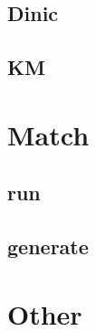 

\subsection{Dinic}




\subsection{KM}


\newpage

\section{Match}

\subsection{run}


\subsection{generate}


\section{Other}


